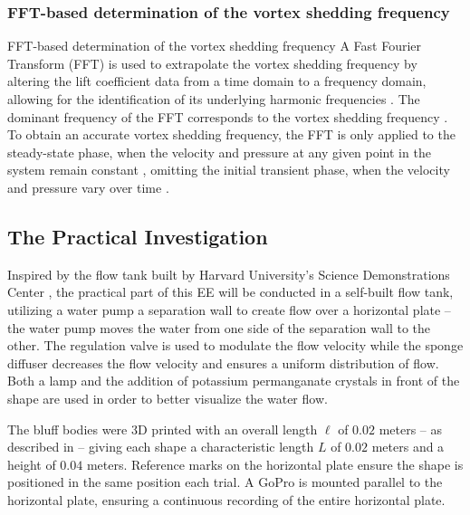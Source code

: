 \subsubsection{FFT-based determination of the vortex shedding frequency}
FFT-based determination of the vortex shedding frequency
A Fast Fourier Transform (FFT) is used to extrapolate the vortex shedding frequency by altering the lift coefficient data from a time domain to a frequency domain, allowing for the identification of its underlying harmonic frequencies \parencite[10--11]{shi2025vortex}. The dominant frequency of the FFT corresponds to the vortex shedding frequency \parencite[12]{xu_experimental_2025}. To obtain an accurate vortex shedding frequency, the FFT is only applied to the steady-state phase, when the velocity and pressure at any given point in the system remain constant \parencite{noauthor_steady_nodate}, omitting the initial transient phase, when the velocity and pressure vary over time \parencite{noauthor_transient_nodate}. 

\subsection{The Practical Investigation}
Inspired by the flow tank built by Harvard University’s Science Demonstrations Center \parencite{noauthor_vortex_nodate}, the practical part of this EE will be conducted in a self-built flow tank, utilizing a water pump a separation wall to create flow over a horizontal plate – the water pump moves the water from one side of the separation wall to the other. The regulation valve is used to modulate the flow velocity while the sponge diffuser decreases the flow velocity and ensures a uniform distribution of flow. Both a lamp and the addition of potassium permanganate crystals in front of the shape are used in order to better visualize the water flow. 

The bluff bodies were 3D printed with an overall length $\ell$ of $0.02$ meters – as described in  – giving each shape a characteristic length $L$ of $0.02$ meters and a height of $0.04$ meters. Reference marks on the horizontal plate ensure the shape is positioned in the same position each trial. A GoPro is mounted parallel to the horizontal plate, ensuring a continuous recording of the entire horizontal plate. 


